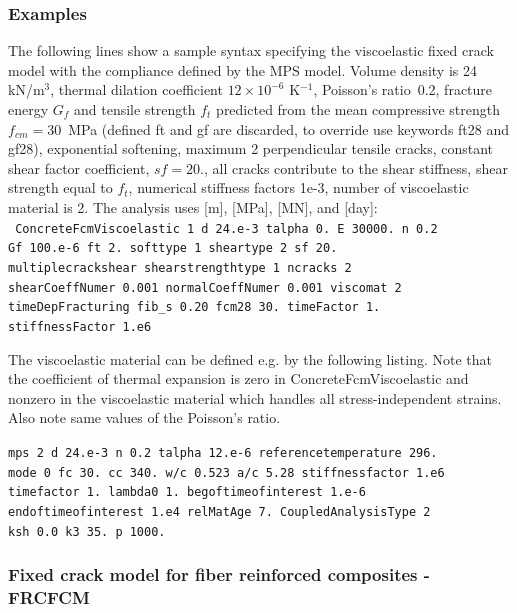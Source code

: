 \documentclass[a4paper]{article}
\begin{document}
\subsubsection*{Examples}
The following lines show a sample syntax specifying the viscoelastic
fixed crack model with the compliance defined by the MPS model.
Volume density is 24 kN/m$^3$, thermal dilation coefficient
$12\times10^{-6}$ K$^{-1}$, Poisson's ratio~0.2,
fracture energy $G_f$ and tensile strength $f_t$ predicted from the
mean compressive strength $f_{cm} = 30$~MPa (defined ft and gf are
discarded, to override use keywords ft28 and gf28),
exponential softening, maximum 2 perpendicular tensile cracks,
constant shear factor coefficient, $sf = 20.$,
all cracks contribute to the shear stiffness,
shear strength equal to $f_t$, numerical stiffness factors 1e-3,
number of viscoelastic material is 2.
The analysis uses [m], [MPa], [MN], and [day]:\\
%
\noindent
\texttt{
  ConcreteFcmViscoelastic 1 d 24.e-3 talpha 0. E 30000. n 0.2\\
  Gf 100.e-6 ft 2. softtype 1 sheartype 2 sf 20.\\
  multiplecrackshear shearstrengthtype 1 ncracks 2\\
  shearCoeffNumer 0.001 normalCoeffNumer 0.001 viscomat 2\\
  timeDepFracturing fib\_s 0.20 fcm28 30. timeFactor 1.\\
  stiffnessFactor 1.e6}

The viscoelastic material can be defined e.g. by the following
listing. Note that the coefficient of thermal expansion is zero in
ConcreteFcmViscoelastic and nonzero in the viscoelastic material which
handles all stress-independent strains. Also note same values of the Poisson's ratio.

\noindent
\texttt{mps 2 d 24.e-3 n 0.2 talpha 12.e-6 referencetemperature  296.\\
  mode 0  fc 30. cc 340. w/c 0.523 a/c 5.28 stiffnessfactor 1.e6 \\
  timefactor 1. lambda0 1. begoftimeofinterest 1.e-6 \\
  endoftimeofinterest 1.e4 relMatAge 7. CoupledAnalysisType 2 \\
  ksh 0.0 k3 35. p 1000.}




\subsubsection{Fixed crack model for fiber reinforced composites - FRCFCM}
\end{document}
